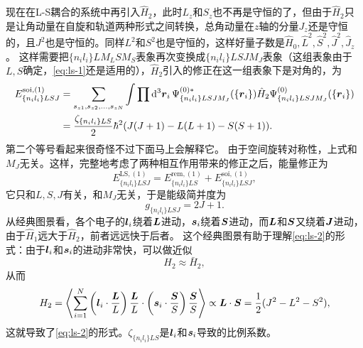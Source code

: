 \documentclass[UTF8, a4paper]{ctexart}
\begin{document}
现在在L-S耦合的系统中再引入$\hat{H}_2$，此时$L_z$和$S_z$也不再是守恒的了，但由于$\hat{H}_2$只是让角动量在自旋和轨道两种形式之间转换，总角动量在$z$轴的分量$J_z$还是守恒的，且$J^2$也是守恒的。同样$L^2$和$S^2$也是守恒的，这样好量子数是$\hat{H}_0, \hat{L}^2, \hat{S}^2, \hat{J}^2, \hat{J}_z$。
这样需要把$\{n_i l_i\} L M_L S M_S$表象再次变换成$\{n_i l_i\} L S J M_J$表象（这组表象由于$L,S$确定，\eqref{eq:ls-1}还是适用的），$\hat{H}_2$引入的修正在这一组表象下是对角的，为
\begin{equation}
    \begin{aligned}
        E^{\text{soi}, (1)}_{\{n_i l_i\} LSJ} &= \sum_{s_{z1}, s_{z2}, \ldots, s_{zN}} \int \prod \dd[3]{\vb*{r}_i} \Psi^{(0) *}_{\{n_i l_i\} L S J M_J}(\{\vb*{r}_i\}) \hat{H}_2 \Psi^{(0)}_{\{n_i l_i\} L S J M_J}(\{\vb*{r}_i\}) \\
        &= \frac{\zeta_{\{n_i l_i\}LS}}{2} \hbar^2 (J(J+1) - L(L+1) - S(S+1)).
        \label{eq:ls-2}
    \end{aligned}
\end{equation}
第二个等号看起来很奇怪不过下面马上会解释它。
由于空间旋转对称性，上式和$M_J$无关。这样，完整地考虑了两种相互作用带来的修正之后，能量修正为
\begin{equation}
    E^{\text{LS}, (1)}_{\{n_i l_i\} LSJ} = E^{\text{rem}, (1)}_{\{n_i l_i\} LS} + E^{\text{soi}, (1)}_{\{n_i l_i\} LSJ},
\end{equation}
它只和$L,S,J$有关，和$M_J$无关，于是能级简并度为
\begin{equation}
    g_{\{n_i l_i\}LSJ} = 2J + 1.
\end{equation}
从经典图景看，各个电子的$\vb*{l}_i$绕着$\vb*{L}$进动，$\vb*{s}_i$绕着$\vb*{S}$进动，而$\vb*{L}$和$\vb*{S}$又绕着$\vb*{J}$进动，由于$\hat{H}_1$远大于$\hat{H}_2$，前者远远快于后者。
这个经典图景有助于理解\eqref{eq:ls-2}的形式：由于$\vb*{l}_i$和$\vb*{s}_i$的进动非常快，可以做近似
\[
    H_2 \approx \bar{H}_2,
\]
从而
\[
    H_2 = \expval{\sum_{i=1}^N \left(\vb*{l}_i \cdot \frac{\vb*{L}}{L} \right) \frac{\vb*{L}}{L} \cdot \left(\vb*{s}_i \cdot \frac{\vb*{S}}{S} \right) \frac{\vb*{S}}{S} } \propto \vb*{L} \cdot \vb*{S} = \frac{1}{2} (J^2 - L^2 - S^2),
\]
这就导致了\eqref{eq:ls-2}的形式。$\zeta_{\{n_i l_i\}LS}$是$\vb*{l}_i$和$\vb*{s}_i$导致的比例系数。
\end{document}
